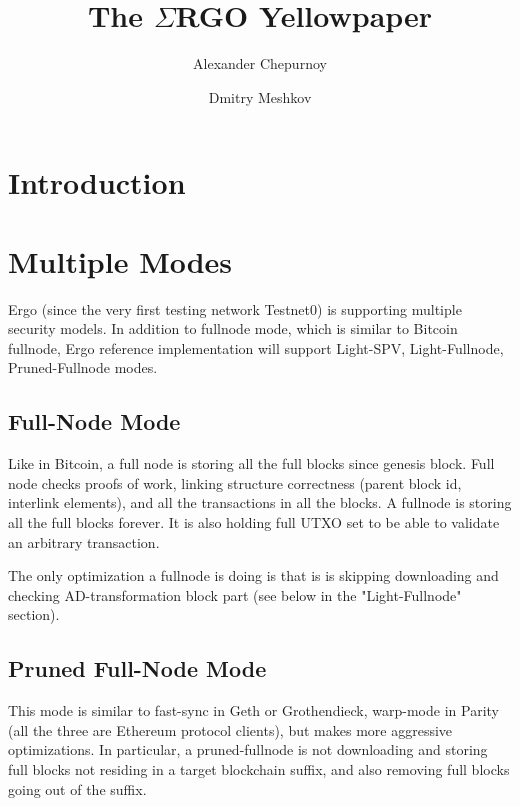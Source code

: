 \documentclass[]{report}   %
\newcommand{\ergo}{$\Sigma$RGO}
\begin{document}
\title{The \ergo{} Yellowpaper}
\author{Alexander Chepurnoy \and Dmitry Meshkov}
\maketitle

\newpage
\tableofcontents

\section{Introduction}

\section{Multiple Modes}
\label{sec:modes}

Ergo (since the very first testing network Testnet0) is supporting  
multiple security models. In addition to fullnode mode, which is
similar to Bitcoin fullnode, Ergo reference implementation will 
support Light-SPV, Light-Fullnode, Pruned-Fullnode modes.
  

\subsection{Full-Node Mode}  
\label{sec:fullnode}

  
Like in Bitcoin, a full node is storing all the full blocks since 
genesis block. Full node checks proofs of work, linking structure 
correctness (parent block id, interlink elements), and all the 
transactions in all the blocks. A fullnode is storing all the full 
blocks forever. It is also holding full UTXO set to be able to validate an 
arbitrary transaction. 

The only optimization a fullnode is doing is that is is skipping downloading and checking 
AD-transformation block part (see below in the "Light-Fullnode" section).

   
\subsection{Pruned Full-Node Mode}
\label{sec:pruned}

   
This mode is similar to fast-sync in Geth or Grothendieck, warp-mode 
in Parity (all the three are Ethereum protocol clients), but makes
 more aggressive optimizations. In particular, a pruned-fullnode is 
 not downloading and storing full blocks not residing in a target 
 blockchain suffix, and also removing full blocks going out of the suffix.
 
\end{document}
